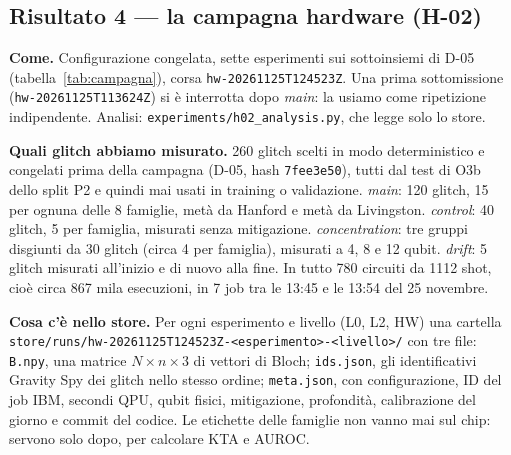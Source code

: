 

\subsection{Risultato 4 --- la campagna hardware (H-02)}
\textbf{Come.} Configurazione congelata, sette esperimenti sui sottoinsiemi di D-05 (tabella~\ref{tab:campagna}),
corsa \texttt{hw-20261125T124523Z}. Una prima sottomissione (\texttt{hw-20261125T113624Z}) si è interrotta dopo
\emph{main}: la usiamo come ripetizione indipendente. Analisi: \texttt{experiments/h02\_analysis.py}, che legge solo lo
store.

\textbf{Quali glitch abbiamo misurato.} 260 glitch scelti in modo deterministico e congelati prima della campagna
(D-05, hash \texttt{7fee3e50}), tutti dal test di O3b dello split P2 e quindi mai usati in training o validazione.
\emph{main}: 120 glitch, 15 per ognuna delle 8 famiglie, metà da Hanford e metà da Livingston. \emph{control}: 40 glitch,
5 per famiglia, misurati senza mitigazione. \emph{concentration}: tre gruppi disgiunti da 30 glitch (circa 4 per
famiglia), misurati a 4, 8 e 12 qubit. \emph{drift}: 5 glitch misurati all’inizio e di nuovo alla fine. In tutto 780
circuiti da 1112 shot, cioè circa 867 mila esecuzioni, in 7 job tra le 13:45 e le 13:54 del 25 novembre.

\textbf{Cosa c’è nello store.} Per ogni esperimento e livello (L0, L2, HW) una cartella
\texttt{store/runs/hw-20261125T124523Z-<esperimento>-<livello>/} con tre file: \texttt{B.npy}, una matrice
$N\times n\times3$ di vettori di Bloch; \texttt{ids.json}, gli identificativi Gravity Spy dei glitch nello stesso
ordine; \texttt{meta.json}, con configurazione, ID del job IBM, secondi QPU, qubit fisici, mitigazione, profondità,
calibrazione del giorno e commit del codice. Le etichette delle famiglie non vanno mai sul chip: servono solo dopo, per
calcolare KTA e AUROC.

